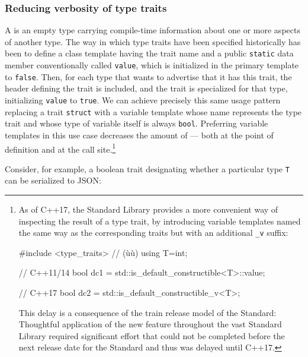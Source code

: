 \subsubsection[Reducing verbosity of type traits]{Reducing verbosity of type traits}\label{reducing-verbosity-of-type-traits}

A  is an empty type carrying compile-time information
about one or more aspects of another type. The way in which type traits
have been specified historically has been to define a class template
having the trait name and a public \lstinline!static!
data member conventionally called \lstinline!value!, which is
initialized in the primary template to \lstinline!false!. Then, for each
type that wants to advertise that it has this trait, the header defining
the trait is included, and the trait is specialized for that type,
initializing \lstinline!value! to \lstinline!true!. We can achieve precisely
this same usage pattern replacing a trait \lstinline!struct! with a
variable template whose name represents the type trait and whose type of
variable itself is always \lstinline!bool!. Preferring variable templates
in this use case decreases the amount of  ---
both at the point of definition and at the call
site.{\cprotect\footnote{As of C++17, the Standard Library provides a
more convenient way of inspecting the result of a type trait, by
introducing variable templates named the same way as the corresponding
traits but with an additional \lstinline!_v! suffix:

\begin{emcppshiddenlisting}[emcppsbatch=e5,emcppsstandards={c++17},style=footcode]
#include <type_traits>  // (ù{}ù)
using T=int;
\end{emcppshiddenlisting}
\begin{emcppslisting}[emcppsbatch=e5,emcppsstandards={c++14},style=footcode]
// C++11/14
bool dc1 = std::is_default_constructible<T>::value;

// C++17
bool dc2 = std::is_default_constructible_v<T>;
\end{emcppslisting}
This delay is a consequence of the train release model of the Standard: Thoughtful application of the new feature throughout the vast Standard Library required significant effort that could not be completed before the next release date for the Standard and thus was delayed until C++17.
      }}

Consider, for example, a boolean trait designating whether a particular
type \lstinline!T! can be serialized to JSON:

